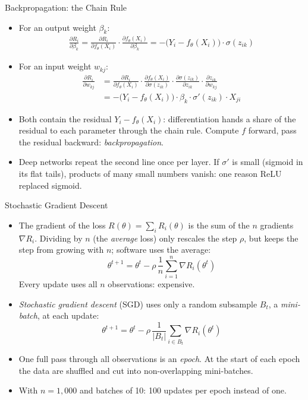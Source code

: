 \documentclass[aspectratio=169,11pt,xcolor=dvipsnames]{beamer}
\newcommand{\adv}{\,\raisebox{0.6pt}{\textcolor{accent}{$\bigstar$}}}
\begin{document}
\begin{frame}{Backpropagation: the Chain Rule\adv}
\begin{itemize}\itemsep3pt
  \item For an output weight $\beta_k$:
  \begin{align*}
    \frac{\partial R_i}{\partial\beta_k}
    = \frac{\partial R_i}{\partial f_\theta(X_i)}\cdot\frac{\partial f_\theta(X_i)}{\partial\beta_k}
    = -\big(Y_i - f_\theta(X_i)\big)\cdot\sigma(z_{ik})
  \end{align*}
  \item For an input weight $w_{kj}$:
  \begin{align*}
    \frac{\partial R_i}{\partial w_{kj}}
    &= \frac{\partial R_i}{\partial f_\theta(X_i)}\cdot\frac{\partial f_\theta(X_i)}{\partial\sigma(z_{ik})}\cdot
       \frac{\partial\sigma(z_{ik})}{\partial z_{ik}}\cdot\frac{\partial z_{ik}}{\partial w_{kj}} \\
    &= -\big(Y_i - f_\theta(X_i)\big)\cdot\beta_k\cdot\sigma'(z_{ik})\cdot X_{ji}
  \end{align*}
  \item Both contain the residual $Y_i - f_\theta(X_i)$: differentiation hands a share of
        the residual to each parameter through the chain rule. Compute $f$ forward,
        pass the residual backward: \textit{backpropagation}.
  \item Deep networks repeat the second line once per layer. If $\sigma'$ is small
        (sigmoid in its flat tails), products of many small numbers vanish: one reason
        ReLU replaced sigmoid.
\end{itemize}
\end{frame}

\begin{frame}{Stochastic Gradient Descent}
\begin{itemize}\itemsep1pt
  \item The gradient of the loss $R(\theta) = \sum_i R_i(\theta)$ is the sum of the $n$ gradients
        $\nabla R_i$. Dividing by $n$ (the \emph{average} loss) only rescales the step $\rho$, but keeps
        the step from growing with $n$; software uses the average:
  \[
    \theta^{t+1} = \theta^t - \rho\,\frac1n\sum_{i=1}^n \nabla R_i(\theta^t)
  \]
        Every update uses all $n$ observations: expensive.
  \item \textit{Stochastic gradient descent} (SGD) uses only a random subsample
        $B_t$, a \textit{mini-batch}, at each update:
  \[
    \theta^{t+1} = \theta^t - \rho\,\frac{1}{|B_t|}\sum_{i\in B_t} \nabla R_i(\theta^t)
  \]
  \item One full pass through all observations is an \textit{epoch}. At the start of
        each epoch the data are shuffled and cut into non-overlapping mini-batches.
  \item With $n = 1{,}000$ and batches of 10: 100 updates per epoch instead of one.
\end{itemize}
\end{frame}
\end{document}
